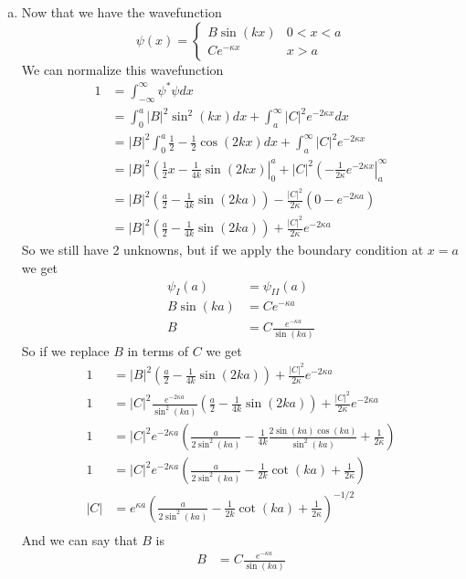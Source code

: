 \documentclass[11pt]{article}
\numberwithin{equation}{section}
\begin{document}
\begin{enumerate}[(a)]
\item
Now that we have the wavefunction
$$\psi(x) = \left\{\begin{array}{ll}
	B\sin(kx)	&0<x<a\\
	Ce^{-\kappa x}	&x>a
	\end{array}\right.$$
We can normalize this wavefunction
\begin{align*}
1 &= \int_{-\infty}^{\infty}\psi^*\psi dx\\
&= \int_{0}^{a}|B|^2\sin^2(kx)dx+\int_a^{\infty}|C|^2e^{-2\kappa x}dx\\
&= |B|^2\int_{0}^{a}\frac{1}{2}-\frac{1}{2}\cos(2kx)dx+\int_a^{\infty}|C|^2e^{-2\kappa x}\\
&= |B|^2\left(\frac{1}{2}x-\frac{1}{4k}\sin(2kx)\right|_0^a+|C|^2\left(-\frac{1}{2\kappa}e^{-2\kappa x}\right|_a^{\infty}\\
&= |B|^2\left(\frac{a}{2}-\frac{1}{4k}\sin(2ka)\right)-\frac{|C|^2}{2\kappa}\left(0-e^{-2\kappa a}\right)\\
&= |B|^2\left(\frac{a}{2}-\frac{1}{4k}\sin(2ka)\right)+\frac{|C|^2}{2\kappa}e^{-2\kappa a}
\end{align*}
So we still have 2 unknowns, but if we apply the boundary condition at $x=a$ we get
\begin{align*}
\psi_I(a) &= \psi_{II}(a)\\
B\sin(ka) &= Ce^{-\kappa a}\\
B &= C\frac{e^{-\kappa a}}{\sin(ka)}
\end{align*}
So if we replace $B$ in terms of $C$ we get
\begin{align*}
1 &= |B|^2\left(\frac{a}{2}-\frac{1}{4k}\sin(2ka)\right)+\frac{|C|^2}{2\kappa}e^{-2\kappa a}\\
1 &= |C|^2\frac{e^{-2\kappa a}}{\sin^2(ka)}\left(\frac{a}{2}-\frac{1}{4k}\sin(2ka)\right)+\frac{|C|^2}{2\kappa}e^{-2\kappa a}\\
1 &= |C|^2e^{-2\kappa a}\left(\frac{a}{2\sin^2(ka)}-\frac{1}{4k}\frac{2\sin(ka)\cos(ka)}{\sin^2(ka)}+\frac{1}{2\kappa}\right)\\
1 &= |C|^2e^{-2\kappa a}\left(\frac{a}{2\sin^2(ka)}-\frac{1}{2k}\cot(ka)+\frac{1}{2\kappa}\right)\\
|C| &= e^{\kappa a}\left(\frac{a}{2\sin^2(ka)}-\frac{1}{2k}\cot(ka)+\frac{1}{2\kappa}\right)^{-1/2}\\
\end{align*}
And we can say that $B$ is
\begin{align*}
B &= C\frac{e^{-\kappa a}}{\sin(ka)}\\

\end{align*}
\end{enumerate}
\end{document}

